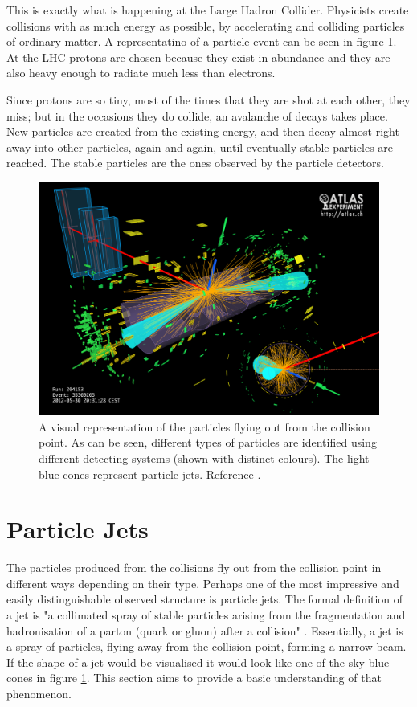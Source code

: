 This is exactly what is happening at the Large Hadron Collider. Physicists create collisions with as much energy as possible, by accelerating and colliding particles of ordinary matter. A representatino of a particle event can be seen in figure \ref{fig:jets1}. At the LHC protons are chosen because they exist in abundance and they are also heavy enough to radiate much less than electrons.

Since protons are so tiny, most of the times that they are shot at each other, they miss; but in the occasions they do collide, an avalanche of decays takes place. New particles are created from the existing energy, and then decay almost right away into other particles, again and again, until eventually stable particles are reached. The stable particles are the ones observed by the particle detectors.

\begin{figure}[H]
\centering
  \includegraphics[width=\linewidth]{images/jets1.png}
  \caption{A visual representation of the particles flying out from the collision point. As can be seen, different types of particles are identified using different detecting systems (shown with distinct colours). The light blue cones represent particle jets. Reference \cite{aad2008atlas}.}
   \label{fig:jets1}
\end{figure}


\section{Particle Jets}\label{ch:particlejets}
The particles produced from the collisions fly out from the collision point in different ways depending on their type. Perhaps one of the most impressive and easily distinguishable observed structure is particle jets.  The formal definition of a jet is "a collimated spray of stable particles arising from the fragmentation and hadronisation of a parton (quark or gluon) after a collision" \cite{atkin2015review}. Essentially, a jet is a spray of particles, flying away from the collision point, forming a narrow beam. If the shape of a jet would be visualised it would look like one of the sky blue cones in figure \ref{fig:jets1}. This section aims to provide a basic understanding of that phenomenon.


